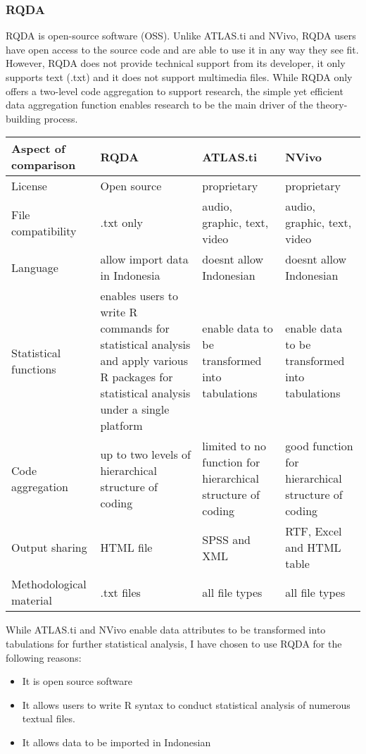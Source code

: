 \documentclass{article}
\begin{document}
\subsubsection{RQDA}
RQDA is open-source software (OSS). Unlike ATLAS.ti and NVivo, RQDA users have open access to the source code and are able to use it in any way they see fit. However, RQDA does not provide technical support from its developer, it only supports text (.txt) and it does not support multimedia files. While RQDA only offers a two-level code aggregation to support research, the simple yet efficient data aggregation function enables research to be the main driver of the theory-building process.

\begin{tabu} to 1.0\textwidth { | X[l] | X[l] | X[l]| X[l]|}
 \hline
 Aspect of comparison & RQDA & ATLAS.ti & NVivo \\
 \hline
 License  & Open source  & proprietary & proprietary  \\
\hline
File compatibility & .txt only & audio, graphic, text, video & audio, graphic, text, video \\
\hline
Language & allow import data in Indonesia & doesnt allow Indonesian & doesnt allow Indonesian\\
\hline 
Statistical functions & enables users to write R commands for statistical analysis and apply various R packages for statistical analysis under a single platform & enable data to be transformed into tabulations & enable data to be transformed into tabulations\\
\hline
Code aggregation & up to two levels of hierarchical structure of coding & limited to no function for hierarchical structure of coding & good function for hierarchical structure of coding\\
\hline Output sharing & HTML file & SPSS and XML & RTF, Excel and HTML table \\
\hline 
Methodological material & .txt files & all file types & all file types\\
\hline
\end{tabu}

\setlength{\parindent}{0em}
\setlength{\parskip}{1em}

While ATLAS.ti and NVivo enable data attributes to be transformed into tabulations for further statistical analysis, I have chosen to use RQDA for the following reasons:
\begin{itemize}
    \item It is open source software
    \item It allows users to write R syntax to conduct statistical analysis of numerous textual files. 
    \item It allows data to be imported in Indonesian 
\end{itemize}
\end{document}
